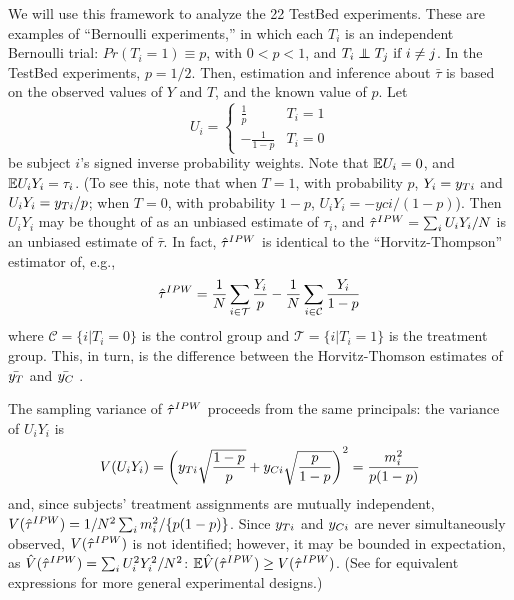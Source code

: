 We will use this framework to analyze the 22 TestBed experiments.
These are examples of ``Bernoulli experiments,'' in
which each $T_i$ is an
independent Bernoulli trial: $Pr(T_i=1)\equiv p$, with $0<p<1$, and
$T_i\independent T_j \text{ if } i\ne j$.
In the TestBed experiments,
$p=1/2$.
Then, estimation and inference about $\bar{\tau}$ is based on
the observed values of $Y$ and $T$, and the known value of $p$.
Let
\begin{equation*}
U_i=\begin{cases}
\frac{1}{p} & T_i=1\\
-\frac{1}{1-p} & T_i=0
\end{cases}
\end{equation*}
be subject $i$'s signed inverse probability weights.
Note that $\mathbb{E} U_i=0$, and $\mathbb{E} U_iY_i=\tau_i$.
(To see this, note that when $T=1$, with probability $p$,
$Y_i=y_{Ti}$ and $U_iY_i=y_{Ti}/p$; when $T=0$, with probability
$1-p$, $U_iY_i=-yci/(1-p)$).
Then $U_iY_i$ may be thought of as an unbiased estimate of $\tau_i$, and $\hat{\tau}^{IPW}=\sum_iU_iY_i/N$ is an unbiased estimate
of $\bar{\tau}$.
In fact, $\hat{\tau}^{IPW}$ is identical to the ``Horvitz-Thompson'' estimator
of, e.g., \citet{aronowMiddleton}
\begin{equation*}
\hat{\tau}^{IPW}=\frac{1}{N}\displaystyle\sum_{i\in\mathcal{T}}
\frac{Y_i}{p}-\frac{1}{N}\displaystyle\sum_{i\in\mathcal{C}}\frac{Y_i}{1-p}
\end{equation*}
where $\mathcal{C} = \{i | T_i = 0\}$ is the control group and
$\mathcal{T} = \{i | T_i = 1\}$ is the treatment group.
This, in turn, is the difference between the Horvitz-Thomson
estimates of $\bar{y_T}$ and $\bar{y_C}$ \citep{horvitzThompson}.

\sloppy
The sampling variance of $\hat{\tau}^{IPW}$ proceeds from the same principals:
the variance of $U_iY_i$ is
\begin{equation}\label{eq:varTauHat1}
V(U_iY_i)=\left(y_{Ti}\sqrt{\frac{1-p}{p}}+y_{Ci}\sqrt{\frac{p}{1-p}}\right)^2=\frac{m_i^2}{p(1-p)}
\end{equation}
and, since  subjects' treatment assignments are mutually independent,
$V(\hat{\tau}^{IPW})=1/N^2\sum_im_i^2/\{p(1-p)\}$.
Since $y_{Ti} $ and $y_{Ci} $ are never simultaneously observed,
$V(\hat{\tau}^{IPW})$ is not identified; however, it may be bounded in expectation,
as $\hat{V}(\hat{\tau}^{IPW})=\sum_iU_i^2Y_i^2/N^2$:
$\mathbb{E}\hat{V}(\hat{\tau}^{IPW})\ge V(\hat{\tau}^{IPW})$.
(See \citealt{aronowMiddleton} for equivalent expressions for more
general experimental designs.)

